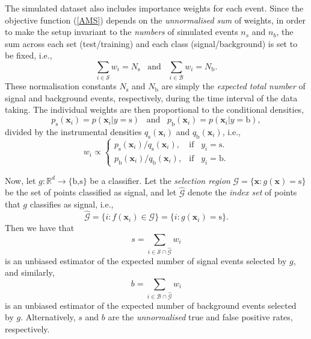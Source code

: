 \documentclass[]{article}
\begin{document}
The simulated dataset also includes importance weights for each event. Since the objective function (\ref{AMS}) depends on the \textit{unnormalised sum} of weights, in order to make the setup invariant to the \textit{numbers} of simulated events $n_s$ and $n_b$, the sum across each set (test/training) and each class (signal/background) is set to be fixed, i.e.,
\begin{equation}
	\sum_{i \in \mathcal{S}} w_i = N_\text{s} \hspace{10pt} \text{and} \hspace{10pt} \sum_{i \in \mathcal{B}} w_i = N_\text{b}.
\end{equation}
These normalisation constants $N_\text{s}$ and $N_\text{b}$ are simply the \textit{expected total number} of signal and background events, respectively, during the time interval of the data taking. The individual weights are then proportional to the conditional densities,
$$ p_\text{s}(\bm{x}_i) = p(\bm{x}_i|y=\text{s}) \hspace{10pt} \text{and} \hspace{10pt} p_\text{b}(\bm{x}_i) = p(\bm{x}_i|y=\text{b}), $$
divided by the instrumental densities $q_\text{s}(\bm{x}_i)$ and $q_\text{b}(\bm{x}_i)$, i.e.,
\begin{equation}
	w_i \propto \begin{cases}
	p_\text{s}(\bm{x}_i)/ q_\text{s}(\bm{x}_i), & \text{if} \hspace{10pt} y_i= \text{s}. \\
	p_\text{b}(\bm{x}_i) / q_\text{b}(\bm{x}_i), & \text{if} \hspace{10pt} y_i= \text{b}.
	\end{cases}
\end{equation}


Now, let $g: \mathbb{R}^d \to \{\text{b,s}\}$ be a classifier. Let the \textit{selection region} $\mathcal{G} = \{\bm{x}: g(\bm{x}) = \text{s}\}$ be the set of points classified as signal, and let $\hat{\mathcal{G}}$ denote the \textit{index set} of points that $g$ classifies as signal, i.e.,
$$ \hat{\mathcal{G}} = \{i:f(\bm{x}_i) \in \mathcal{G}\} = \{i : g(\bm{x}_i) = \text{s}\}. $$
Then we have that
\begin{equation}
\label{s weights}
	s = \sum_{i \in \mathcal{S} \cap \hat{\mathcal{G}}} w_i
\end{equation}
is an unbiased estimator of the expected number of signal events selected by $g$, and similarly,
\begin{equation}
\label{b weights}
b = \sum_{i \in \mathcal{B} \cap \hat{\mathcal{G}}} w_i
\end{equation}
is an unbiased estimator of the expected number of background events selected by $g$. Alternatively, $s$ and $b$ are the \textit{unnormalised} true and false positive rates, respectively.
\end{document}
